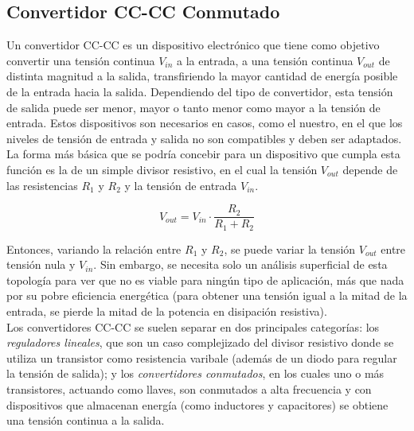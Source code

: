 \subsection{Convertidor CC-CC Conmutado}

Un convertidor CC-CC es un dispositivo electrónico que tiene como objetivo convertir una tensión continua $V_{in}$ a la entrada, a una tensión continua $V_{out}$ de distinta magnitud a la salida, transfiriendo la mayor cantidad de energía posible de la entrada hacia la salida. Dependiendo del tipo de convertidor, esta tensión de salida puede ser menor, mayor o tanto menor como mayor a la tensión de entrada. Estos dispositivos son necesarios en casos, como el nuestro, en el que los niveles de tensión de entrada y salida no son compatibles y deben ser adaptados.\\

La forma más básica que se podría concebir para un dispositivo que cumpla esta función es la de un simple divisor resistivo, en el cual la tensión $V_{out}$ depende de las resistencias $R_1$ y $R_2$ y la tensión de entrada $V_{in}$.

\begin{equation*}
    V_{out} = V_{in}\cdot\frac{R_2}{R_1+R_2}
\end{equation*}

Entonces, variando la relación entre $R_1$ y $R_2$, se puede variar la tensión $V_{out}$ entre tensión nula y $V_{in}$. Sin embargo, se necesita solo un análisis superficial de esta topología para ver que no es viable para ningún tipo de aplicación, más que nada por su pobre eficiencia energética (para obtener una tensión igual a la mitad de la entrada, se pierde la mitad de la potencia en disipación resistiva).\\

Los convertidores CC-CC se suelen separar en dos principales categorías: los \textit{reguladores lineales}, que son un caso complejizado del divisor resistivo donde se utiliza un transistor como resistencia varibale (además de un diodo para regular la tensión de salida); y los \textit{convertidores conmutados}, en los cuales uno o más transistores, actuando como llaves, son conmutados a alta frecuencia y con dispositivos que almacenan energía (como inductores y capacitores) se obtiene una tensión continua a la salida.\\